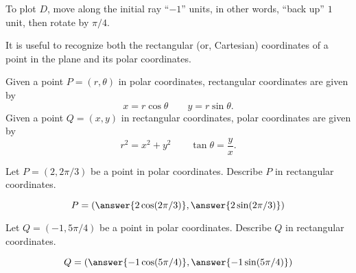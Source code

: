 \documentclass{ximera}
\begin{document}
\begin{example}
\begin{explanation}
  To plot $D$, move along the initial ray ``$-1$'' units, in other
  words, ``back up'' $1$ unit, then rotate
   by
  $\pi/4$.
  \begin{hint}
    \begin{image}
    \end{image}
  \end{hint}
\end{explanation}
\end{example}


It is useful to recognize both the rectangular (or, Cartesian)
coordinates of a point in the plane and its polar coordinates.

\begin{theorem}
Given a point $P=(r,\theta)$ in polar coordinates, rectangular
coordinates are given by
\[
x=r\cos \theta\qquad y=r\sin \theta.
\]
Given a point $Q=(x,y)$ in rectangular coordinates, polar coordinates
are given by
\[
r^2=x^2+y^2\qquad \tan \theta = \frac yx.
\]
\end{theorem}

\begin{question}
  Let $P=(2,2\pi/3)$ be a point in polar coordinates. Describe $P$ in
  rectangular coordinates.
  \begin{prompt}
    \[
    P = (\answer{2\cos (2\pi/3)}, \answer{2\sin (2\pi/3)})
    \]
  \end{prompt}
  \begin{question}
  Let $Q=(-1,5\pi/4)$ be a point in polar coordinates. Describe $Q$ in
  rectangular coordinates.
  \begin{prompt}
    \[
    Q = (\answer{-1\cos (5\pi/4)}, \answer{-1\sin (5\pi/4)})
    \]
  \end{prompt}
\end{question}
\end{question}
\end{document}
